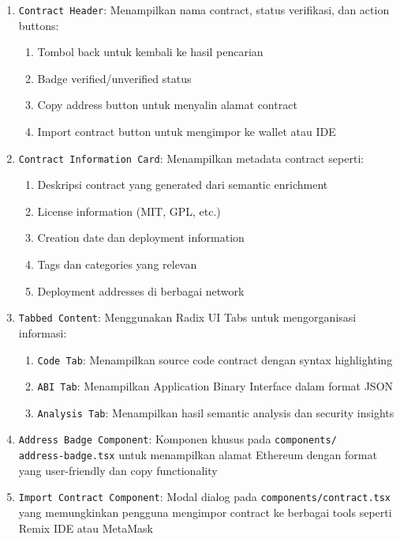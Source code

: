 \begin{enumerate}
    \item \texttt{Contract Header}: Menampilkan nama contract, status verifikasi, dan action buttons:
    \begin{enumerate}
        \item Tombol back untuk kembali ke hasil pencarian
        \item Badge verified/unverified status
        \item Copy address button untuk menyalin alamat contract
        \item Import contract button untuk mengimpor ke wallet atau IDE
    \end{enumerate}
    \item \texttt{Contract Information Card}: Menampilkan metadata contract seperti:
    \begin{enumerate}
        \item Deskripsi contract yang generated dari semantic enrichment
        \item License information (MIT, GPL, etc.)
        \item Creation date dan deployment information
        \item Tags dan categories yang relevan
        \item Deployment addresses di berbagai network
    \end{enumerate}
    \item \texttt{Tabbed Content}: Menggunakan Radix UI Tabs untuk mengorganisasi informasi:
    \begin{enumerate}
        \item \texttt{Code Tab}: Menampilkan source code contract dengan syntax highlighting
        \item \texttt{ABI Tab}: Menampilkan Application Binary Interface dalam format JSON
        \item \texttt{Analysis Tab}: Menampilkan hasil semantic analysis dan security insights
    \end{enumerate}
    \item \texttt{Address Badge Component}: Komponen khusus pada \texttt{components/\\address-badge.tsx} untuk menampilkan alamat Ethereum dengan format yang user-friendly dan copy functionality
    \item \texttt{Import Contract Component}: Modal dialog pada \texttt{components/\-contract.tsx} yang memungkinkan pengguna mengimpor contract ke berbagai tools seperti Remix IDE atau MetaMask
\end{enumerate}

